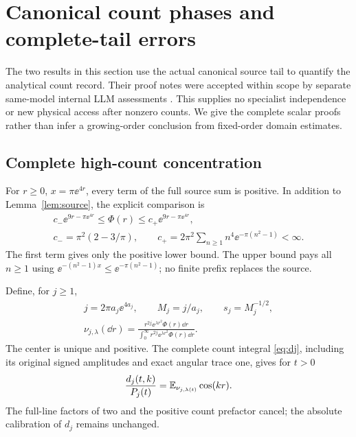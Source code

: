 \section{Canonical count phases and complete-tail errors}\label{sec:highcount}

The two results in this section use the actual canonical source tail to
quantify the analytical count record. Their proof notes
\cite{TNDHighCount,TNDCountTail} were accepted within scope by separate
same-model internal LLM assessments
\cite{TNDHighCountReview,TNDCountTailReview}. This supplies no specialist
independence or new physical access after nonzero counts. We give the
complete scalar proofs rather than infer a growing-order conclusion from
fixed-order domain estimates.

\subsection{Complete high-count concentration}
For $r\ge0$, $x=\pi\ee^{4r}$, every term of the full source sum is positive.
In addition to Lemma~\ref{lem:source}, the explicit comparison is
\begin{equation}\label{eq:hccompare}
 \begin{gathered}
 c_-\ee^{9r-\pi\ee^{4r}}\le\Phi(r)\le c_+\ee^{9r-\pi\ee^{4r}},\\
 c_-=\pi^2(2-3/\pi),\qquad
 c_+=2\pi^2\sum_{n\ge1}n^4\ee^{-\pi(n^2-1)}<\infty.
 \end{gathered}
\end{equation}
The first term gives only the positive lower bound. The upper bound pays
all $n\ge1$ using $\ee^{-(n^2-1)x}\le\ee^{-\pi(n^2-1)}$; no finite
prefix replaces the source.

Define, for $j\ge1$,
\begin{equation}\label{eq:hccenter}
 \begin{gathered}
 j=2\pi a_j\ee^{4a_j},\qquad M_j=j/a_j,\qquad s_j=M_j^{-1/2},\\
 \nu_{j,\lambda}(\dd r)=
 \frac{r^{2j}\ee^{\lambda r^2}\Phi(r)\dd r}
 {\int_0^\infty r^{2j}\ee^{\lambda r^2}\Phi(r)\dd r}.
 \end{gathered}
\end{equation}
The center is unique and positive. The complete count integral
\eqref{eq:dj}, including its original signed amplitudes and exact angular
trace one, gives for $t>0$
\begin{equation}\label{eq:hcratio}
 \frac{d_j(t,k)}{P_j(t)}=\mathbb E_{\nu_{j,\lambda(t)}}\cos(kr).
\end{equation}
The full-line factors of two and the positive count prefactor cancel;
the absolute calibration of $d_j$ remains unchanged.


